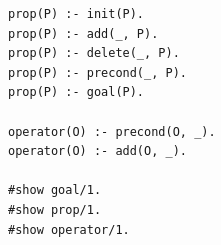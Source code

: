 \begin{lstlisting}[caption={Proposition and operator derivation.},label={lst:planning},style=asp]
prop(P) :- init(P).
prop(P) :- add(_, P).
prop(P) :- delete(_, P).
prop(P) :- precond(_, P).
prop(P) :- goal(P).

operator(O) :- precond(O, _).
operator(O) :- add(O, _).

#show goal/1.
#show prop/1.
#show operator/1.
\end{lstlisting}
